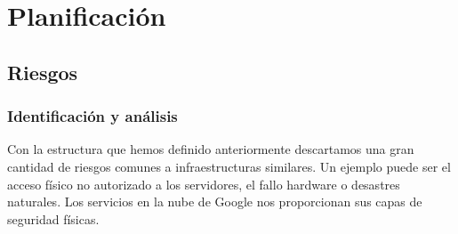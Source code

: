 \chapter{Planificación}
\label{chapter:planificacion}

\section{Riesgos}
\subsection{Identificación y análisis}

Con la estructura que hemos definido anteriormente descartamos una gran cantidad de riesgos comunes a infraestructuras similares. Un ejemplo puede ser el acceso físico no autorizado a los servidores, el fallo hardware o desastres naturales. Los servicios en la nube de Google nos proporcionan sus capas de seguridad físicas\cite{GCPSecurity}.

